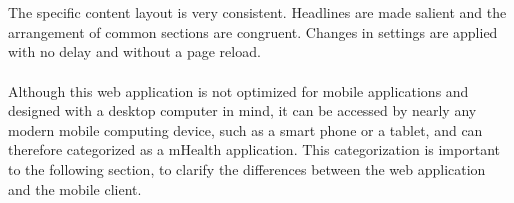 \\
\\
The specific content layout is very consistent. Headlines are made salient and the arrangement of common sections are congruent. Changes in settings are applied with no delay and without a page reload.
\\
\\
Although this web application is not optimized for mobile applications and designed with a desktop computer in mind, it can be accessed by nearly any modern mobile computing device, such as a smart phone or a tablet, and can therefore categorized as a mHealth application. This categorization is important to the following section, to clarify the differences between the web application and the mobile client.